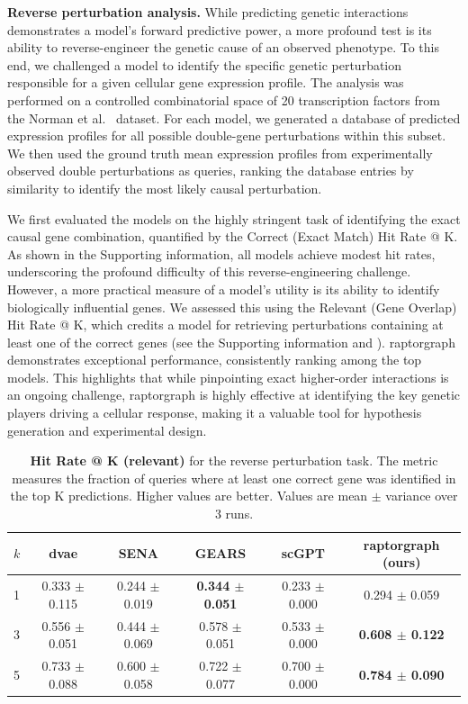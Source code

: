 \documentclass[10pt,letterpaper]{article}
\theoremstyle{definition}
\theoremstyle{remark}
\begin{document}
\textbf{Reverse perturbation analysis.} While predicting genetic interactions demonstrates a model's forward predictive power, a more profound test is its ability to reverse-engineer the genetic cause of an observed phenotype.
To this end, we challenged a model to identify the specific genetic perturbation responsible for a given cellular gene expression profile.
The analysis was performed on a controlled combinatorial space of 20 transcription factors from the Norman et al.~\cite{norman2019exploring} dataset.
For each model, we generated a database of predicted expression profiles for all possible double-gene perturbations within this subset.
We then used the ground truth mean expression profiles from experimentally observed double perturbations as queries, ranking the database entries by similarity to identify the most likely causal perturbation.

We first evaluated the models on the highly stringent task of identifying the exact causal gene combination, quantified by the Correct (Exact Match) Hit Rate @ K.
As shown in the Supporting information, all models achieve modest hit rates, underscoring the profound difficulty of this reverse-engineering challenge.
However, a more practical measure of a model's utility is its ability to identify biologically influential genes.
We assessed this using the Relevant (Gene Overlap) Hit Rate @ K, which credits a model for retrieving perturbations containing at least one of the correct genes (see the Supporting information and ).
\Gls{raptorgraph} demonstrates exceptional performance, consistently ranking among the top models.
This highlights that while pinpointing exact higher-order interactions is an ongoing challenge, \gls{raptorgraph} is highly effective at identifying the key genetic players driving a cellular response, making it a valuable tool for hypothesis generation and experimental design.

\begin{table}[!ht]
\centering
\caption{\textbf{Hit Rate @ K (relevant)} for the reverse perturbation task.
The metric measures the fraction of queries where at least one correct gene was identified in the top K predictions.
Higher values are better.
Values are mean $\pm$ variance over 3 runs.}
\begin{tabular}{lccccc}
\toprule
$k$ & \gls{dvae} & SENA & GEARS & scGPT & \gls{raptorgraph} (ours) \\
\midrule
1 & 0.333 $\pm$ 0.115 & 0.244 $\pm$ 0.019 & \textbf{0.344 $\pm$ 0.051} & 0.233 $\pm$ 0.000 & 0.294 $\pm$ 0.059 \\
3 & 0.556 $\pm$ 0.051 & 0.444 $\pm$ 0.069 & 0.578 $\pm$ 0.051 & 0.533 $\pm$ 0.000 & \textbf{0.608 $\pm$ 0.122} \\
5 & 0.733 $\pm$ 0.088 & 0.600 $\pm$ 0.058 & 0.722 $\pm$ 0.077 & 0.700 $\pm$ 0.000 & \textbf{0.784 $\pm$ 0.090} \\
\bottomrule
\end{tabular}
\label{tab:hit_rate}
\end{table}
\end{document}

